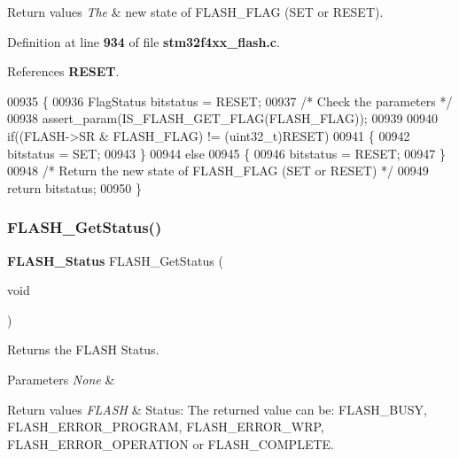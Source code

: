\begin{DoxyRetVals}{Return values}
{\em The} & new state of F\+L\+A\+S\+H\+\_\+\+F\+L\+AG (S\+ET or R\+E\+S\+ET). \\
\hline
\end{DoxyRetVals}


Definition at line \textbf{ 934} of file \textbf{ stm32f4xx\+\_\+flash.\+c}.



References \textbf{ R\+E\+S\+ET}.


\begin{DoxyCode}
00935 \{
00936   FlagStatus bitstatus = RESET;
00937   \textcolor{comment}{/* Check the parameters */}
00938   assert_param(IS_FLASH_GET_FLAG(FLASH\_FLAG));
00939 
00940   \textcolor{keywordflow}{if}((FLASH->SR & FLASH\_FLAG) != (uint32\_t)RESET)
00941   \{
00942     bitstatus = SET;
00943   \}
00944   \textcolor{keywordflow}{else}
00945   \{
00946     bitstatus = RESET;
00947   \}
00948   \textcolor{comment}{/* Return the new state of FLASH\_FLAG (SET or RESET) */}
00949   \textcolor{keywordflow}{return} bitstatus; 
00950 \}
\end{DoxyCode}
\mbox{\label{group__FLASH__Group4_gac265b8d1e7ea11e44ceee28797c3debb}} 
\subsubsection{F\+L\+A\+S\+H\+\_\+\+Get\+Status()}
{\footnotesize\ttfamily \textbf{ F\+L\+A\+S\+H\+\_\+\+Status} F\+L\+A\+S\+H\+\_\+\+Get\+Status (\begin{DoxyParamCaption}\item[{void}]{ }\end{DoxyParamCaption})}



Returns the F\+L\+A\+SH Status. 


\begin{DoxyParams}{Parameters}
{\em None} & \\
\hline
\end{DoxyParams}

\begin{DoxyRetVals}{Return values}
{\em F\+L\+A\+SH} & Status\+: The returned value can be\+: F\+L\+A\+S\+H\+\_\+\+B\+U\+SY, F\+L\+A\+S\+H\+\_\+\+E\+R\+R\+O\+R\+\_\+\+P\+R\+O\+G\+R\+AM, F\+L\+A\+S\+H\+\_\+\+E\+R\+R\+O\+R\+\_\+\+W\+RP, F\+L\+A\+S\+H\+\_\+\+E\+R\+R\+O\+R\+\_\+\+O\+P\+E\+R\+A\+T\+I\+ON or F\+L\+A\+S\+H\+\_\+\+C\+O\+M\+P\+L\+E\+TE. \\
\hline
\end{DoxyRetVals}


